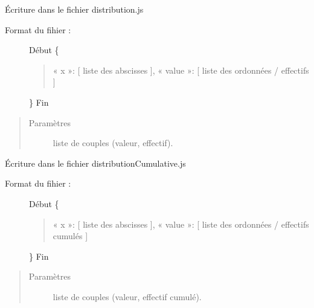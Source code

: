 \documentclass[letterpaper,10pt,french]{sphinxmanual}
\begin{document}
\begin{fulllineitems}
\label{\detokenize{addQuantitativesDiscretes:add.addQuantitativesDiscretes.infoDistributionDiscrete}}
Écriture dans le fichier distribution.js
\begin{description}
\item[{Format du fihier :}] \leavevmode
Début
\{
\begin{quote}

« x »: {[} liste des abscisses {]},
« value »: {[} liste des ordonnées / effectifs {]}
\end{quote}

\}
Fin

\end{description}
\begin{quote}\begin{description}
\item[{Paramètres}] \leavevmode
{} \textendash{} liste de couples (valeur, effectif).

\end{description}\end{quote}

\end{fulllineitems}


\begin{fulllineitems}
\label{\detokenize{addQuantitativesDiscretes:add.addQuantitativesDiscretes.infoDistributionCumulativeDiscrete}}
Écriture dans le fichier distributionCumulative.js
\begin{description}
\item[{Format du fihier :}] \leavevmode
Début
\{
\begin{quote}

« x »: {[} liste des abscisses {]},
« value »: {[} liste des ordonnées / effectifs cumulés {]}
\end{quote}

\}
Fin

\end{description}
\begin{quote}\begin{description}
\item[{Paramètres}] \leavevmode
{} \textendash{} liste de couples (valeur, effectif cumulé).

\end{description}\end{quote}

\end{fulllineitems}
\end{document}
